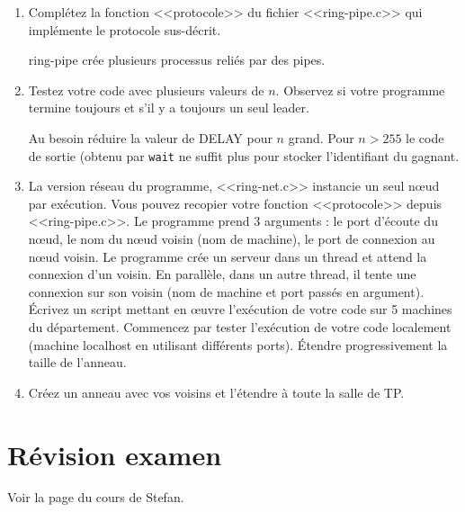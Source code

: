 \documentclass[11pt]{article}
\begin{document}
\begin{enumerate}
 \item Complétez la fonction <<protocole>> du fichier <<ring-pipe.c>> qui
implémente le protocole sus-décrit.
 \begin{solution}
 ring-pipe crée plusieurs processus reliés par des pipes.
 \end{solution}
 \item Testez votre code avec plusieurs valeurs de $n$. Observez si votre
programme termine toujours et s'il y a toujours un seul leader.
 \begin{solution}
 Au besoin réduire la valeur de DELAY pour $n$ grand.
 Pour $n>255$ le code de sortie (obtenu par \texttt{wait} ne suffit plus pour
 stocker l'identifiant du gagnant.
 \end{solution}
 \item La version réseau du programme, <<ring-net.c>> instancie un seul
n\oe{}ud par exécution. Vous pouvez recopier votre fonction <<protocole>>
depuis <<ring-pipe.c>>. Le programme prend 3 arguments : le port d'écoute du
n\oe{}ud, le nom du nœud voisin (nom de machine), le port de connexion au nœud
voisin. Le programme crée un serveur dans un thread et attend la connexion d'un
voisin. En parallèle, dans un autre thread, il tente une connexion sur son
voisin (nom de machine et port passés en argument). Écrivez un script mettant
en œuvre l'exécution de votre code sur 5 machines du département. Commencez par
tester l'exécution de votre code localement (machine localhost en utilisant
différents ports). Étendre progressivement la taille de l'anneau.
 \item Créez un anneau avec vos voisins et l'étendre à toute la salle de TP.
\end{enumerate}

\section{Révision examen}

Voir la page du cours de Stefan.
\end{document}
